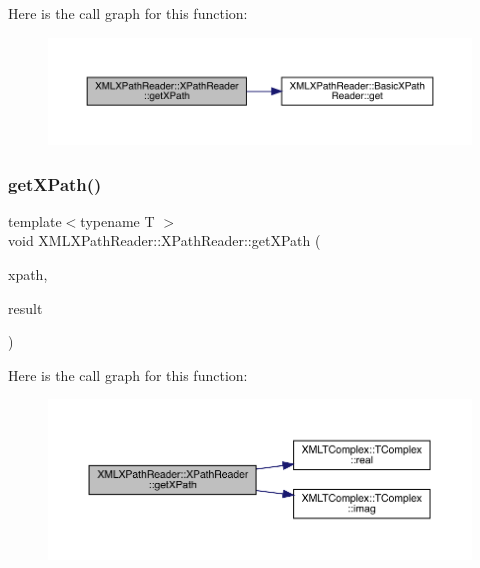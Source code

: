 Here is the call graph for this function\+:
\nopagebreak
\begin{figure}[H]
\begin{center}
\leavevmode
\includegraphics[width=350pt]{d3/d5a/classXMLXPathReader_1_1XPathReader_abbd673bc00e75502126b2cca246ff6f4_cgraph}
\end{center}
\end{figure}
\mbox{\label{classXMLXPathReader_1_1XPathReader_a82579390a7b37879a7a7d9b79934a592}} 
\subsubsection{\texorpdfstring{getXPath()}{getXPath()}\hspace{0.1cm}{\footnotesize\ttfamily [3/6]}}
{\footnotesize\ttfamily template$<$typename T $>$ \\
void X\+M\+L\+X\+Path\+Reader\+::\+X\+Path\+Reader\+::get\+X\+Path (\begin{DoxyParamCaption}\item[{const std\+::string \&}]{xpath,  }\item[{\mbox{\hyperlink{classXMLTComplex_1_1TComplex}{X\+M\+L\+T\+Complex\+::\+T\+Complex}}$<$ T $>$ \&}]{result }\end{DoxyParamCaption})\hspace{0.3cm}{\ttfamily [inline]}}

Here is the call graph for this function\+:
\nopagebreak
\begin{figure}[H]
\begin{center}
\leavevmode
\includegraphics[width=350pt]{d3/d5a/classXMLXPathReader_1_1XPathReader_a82579390a7b37879a7a7d9b79934a592_cgraph}
\end{center}
\end{figure}
\mbox{\label{classXMLXPathReader_1_1XPathReader_a82579390a7b37879a7a7d9b79934a592}} 
